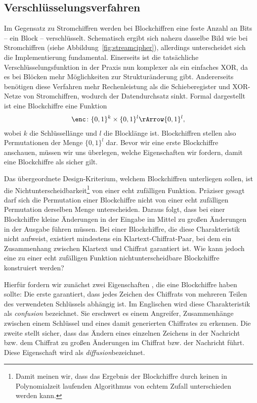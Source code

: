 \subsection{Verschlüsselungsverfahren}
Im Gegensatz zu Stromchiffren werden bei Blockchiffren
 eine feste Anzahl an Bits -- ein Block --
verschlüsselt. Schematisch ergibt sich nahezu dasselbe Bild wie bei
Stromchiffren (siehe Abbildung~\ref{fig:streamcipher}), allerdings
unterscheidet sich die Implementierung fundamental. Einerseits ist die
tatsächliche Verschlüsselungsfunktion in der Praxis nun komplexer als
ein einfaches XOR, da es bei Blöcken mehr Möglichkeiten zur
Strukturänderung gibt. Andererseits benötigen diese Verfahren mehr
Rechenleistung als die Schieberegister und XOR-Netze von Stromchiffren,
wodurch der Datendurchsatz sinkt. 
Formal dargestellt ist eine Blockchiffre eine Funktion
\begin{align*}
  \enc \colon \{0, 1\}^k \times \{0, 1\}^l \rArrow \{0, 1\}^l\text{,}
\end{align*}
wobei \(k\) die Schlüssellänge und \(l\) die Blocklänge
ist. Blockchiffren stellen also Permutationen der Menge  
\(\{0, 1\}^l\) dar.
Bevor wir eine erste Blockchiffre anschauen, müssen wir uns überlegen,
welche Eigenschaften wir fordern, damit eine Blockchiffre als sicher gilt.

Das übergeordnete Design-Kriterium, welchem Blockchiffren unterliegen
sollen, ist die Nichtunterscheidbarkeit\footnote{Damit meinen wir, dass
  das Ergebnis der Blockchiffre durch keinen in Polynomialzeit laufenden
  Algorithmus von echtem Zufall unterschieden werden kann.} von einer
echt zufälligen Funktion. Präziser gesagt darf sich die Permutation
einer Blockchiffre nicht von einer echt zufälligen Permutation derselben
Menge unterscheiden. Daraus folgt, dass bei einer Blockchiffre kleine
Änderungen in der Eingabe im Mittel zu großen Änderungen in der Ausgabe
führen müssen. Bei einer Blockchiffre, die diese Charakteristik nicht
aufweist, existiert mindestens ein Klartext-Chiffrat-Paar, bei dem ein
Zusammenhang zwischen Klartext und Chiffrat garantiert ist. Wie kann
jedoch eine zu einer echt zufälligen Funktion nichtunterscheidbare
Blockchiffre konstruiert werden? 

Hierfür fordern wir zunächst zwei Eigenschaften \cite{Shannon1949}, die
eine Blockchiffre haben sollte: Die erste garantiert, dass jedes Zeichen
des Chiffrats von mehreren Teilen des verwendeten Schlüssels abhängig
ist. Im Englischen wird diese Charakteristik als \emph{confusion}
\indexConfusion bezeichnet. Sie erschwert es einem Angreifer,
Zusammenhänge zwischen einem Schlüssel und eines damit generierten
Chiffrates zu erkennen.  Die zweite stellt sicher, dass das Ändern eines
einzelnen Zeichens in der Nachricht bzw. dem Chiffrat zu großen
Änderungen im Chiffrat bzw. der Nachricht führt. Diese Eigenschaft wird
als \emph{diffusion}\indexDiffusion bezeichnet.

